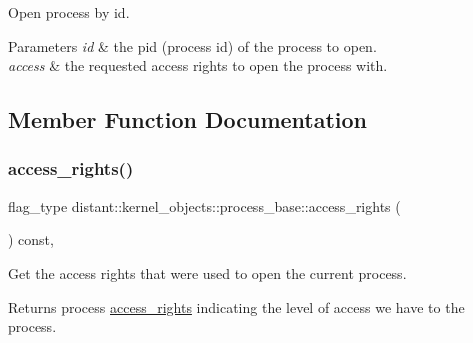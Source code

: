 Open process by id. 


\begin{DoxyParams}{Parameters}
{\em id} & the pid (process id) of the process to open. \\
\hline
{\em access} & the requested access rights to open the process with. \\
\hline
\end{DoxyParams}


\subsection{Member Function Documentation}
\mbox{\label{classdistant_1_1kernel__objects_1_1process__base_a28b2a7b7297714d4c7c4d320a0c4fbbc}} 
\subsubsection{\texorpdfstring{access\+\_\+rights()}{access\_rights()}}
{\footnotesize\ttfamily flag\+\_\+type distant\+::kernel\+\_\+objects\+::process\+\_\+base\+::access\+\_\+rights (\begin{DoxyParamCaption}{ }\end{DoxyParamCaption}) const\hspace{0.3cm}{\ttfamily [inline]}, {\ttfamily [noexcept]}}



Get the access rights that were used to open the current process. 

\begin{DoxyReturn}{Returns}
process \mbox{\hyperlink{structdistant_1_1access__rights}{access\+\_\+rights}} indicating the level of access we have to the process. 
\end{DoxyReturn}
\mbox{\label{classdistant_1_1kernel__objects_1_1process__base_a0c1640e125f4667c139bf9d44f7cd096}} 
